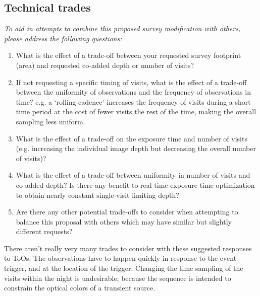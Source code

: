 \documentclass[11pt]{article}
\begin{document}
\subsection{Technical trades}
\begin{footnotesize}
{\it To aid in attempts to combine this proposed survey modification with others, please address the following questions:
\begin{enumerate}
    \item What is the effect of a trade-off between your requested survey footprint (area) and requested co-added depth or number of visits?
    \item If not requesting a specific timing of visits, what is the effect of a trade-off between the uniformity of observations and the frequency of observations in time? e.g. a `rolling cadence' increases the frequency of visits during a short time period at the cost of fewer visits the rest of the time, making the overall sampling less uniform.
    \item What is the effect of a trade-off on the exposure time and number of visits (e.g. increasing the individual image depth but decreasing the overall number of visits)?
    \item What is the effect of a trade-off between uniformity in number of visits and co-added depth? Is there any benefit to real-time exposure time optimization to obtain nearly constant single-visit limiting depth?
    \item Are there any other potential trade-offs to consider when attempting to balance this proposal with others which may have similar but slightly different requests?
\end{enumerate}}
\end{footnotesize}

There aren't really very many trades to consider with these suggested responses to ToOs. The observations have to happen quickly in response to the event trigger, and
at the location of the trigger. Changing the time sampling of the visits within the night is undesirable, because the sequence is intended to constrain the optical
colors of a transient source.
\end{document}
